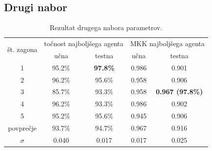 \subsection{Drugi nabor}\label{subsec:dodatek-iris-drugi-nabor}
\begin{table}[H]
    \begin{center}
        \begin{tabular}{|| c | c c || c c ||}
            \hline
            \multirow{2}{*}{št. zagona} & \multicolumn{2}{c||}{točnost najboljšega agenta} & \multicolumn{2}{c||}{MKK najboljšega agenta} \\ \cline{2-5}
            & učna   & testna          & učna  & testna                  \\
            \hline
            1         & 95.2\% & \textbf{97.8\%} & 0.986 & 0.901                   \\
            \hline
            2         & 96.2\% & 95.6\%          & 0.958 & 0.906                   \\
            \hline
            3         & 85.7\% & 93.3\%          & 0.958 & \textbf{0.967 (97.8\%)} \\
            \hline
            4         & 96.2\% & 93.3\%          & 0.986 & 0.902                   \\
            \hline
            5         & 95.2\% & 95.6\%          & 0.945 & 0.906                   \\
            \hline
            povprečje & 93.7\% & 94.7\%          & 0.967 & 0.916                   \\
            \hline
            $\sigma$  & 0.040  & 0.017           & 0.017 & 0.025                   \\
            \hline
        \end{tabular}
    \end{center}
    \caption{Rezultat drugega nabora parametrov.}
    \label{tab:iris_result_2}
\end{table}

